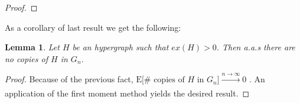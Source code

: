 \documentclass[12pt,notitlepage,a4paper]{article}
\newtheorem{lemma}{Lemma}[section]
\theoremstyle{definition}
\newcommand{\N}{\mathbb{N}}
\newcommand{\Ln}{\lim\limits_{n\to \infty}}
\newcommand{\overbar}[1]{\mkern 1.5mu\overline{\mkern-1.5mu#1\mkern-1.5mu}\mkern 1.5mu}
\begin{document}
\begin{proof}
\end{proof}

As a corollary of last result we get the following:  
\begin{lemma} \label{lem:nocopiesdense}
	Let $H$ be an hypergraph such that $ex(H)>0$. Then
	a.a.s there are no copies of $H$ in $G_n$. 
\end{lemma}  
\begin{proof}
	Because of the previous fact, 
	$\mathrm{E}\big[\# \text{ copies of }H \text{ in } G_n\big] 
	\xrightarrow[]{n\to \infty} 0$ . An application of the first moment
	method yields the desired result. 
\end{proof} 
\end{document}
